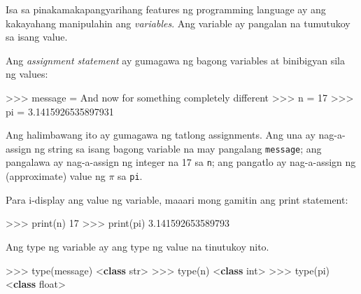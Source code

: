 \documentclass[10pt,]{book}
\newenvironment{Shaded}{}{}
\newcommand{\BuiltInTok}[1]{\textcolor[rgb]{0.00,0.50,0.00}{#1}}
\newcommand{\DecValTok}[1]{\textcolor[rgb]{0.25,0.63,0.44}{#1}}
\newcommand{\FloatTok}[1]{\textcolor[rgb]{0.25,0.63,0.44}{#1}}
\newcommand{\KeywordTok}[1]{\textcolor[rgb]{0.00,0.44,0.13}{\textbf{#1}}}
\newcommand{\NormalTok}[1]{#1}
\newcommand{\OperatorTok}[1]{\textcolor[rgb]{0.40,0.40,0.40}{#1}}
\newcommand{\StringTok}[1]{\textcolor[rgb]{0.25,0.44,0.63}{#1}}
\begin{document}
 

Isa sa pinakamakapangyarihang features ng programming language ay ang
kakayahang manipulahin ang \emph{variables}. Ang variable ay pangalan na
tumutukoy sa isang value.

Ang \emph{assignment statement} ay gumagawa ng bagong variables at
binibigyan sila ng values:

\begin{Shaded}
\begin{Highlighting}[]
\OperatorTok{\textgreater{}\textgreater{}\textgreater{}}\NormalTok{ message }\OperatorTok{=} \StringTok{\textquotesingle{}And now for something completely different\textquotesingle{}}
\OperatorTok{\textgreater{}\textgreater{}\textgreater{}}\NormalTok{ n }\OperatorTok{=} \DecValTok{17}
\OperatorTok{\textgreater{}\textgreater{}\textgreater{}}\NormalTok{ pi }\OperatorTok{=} \FloatTok{3.1415926535897931}
\end{Highlighting}
\end{Shaded}

Ang halimbawang ito ay gumagawa ng tatlong assignments. Ang una ay
nag-a-assign ng string sa isang bagong variable na may pangalang
\texttt{message}; ang pangalawa ay nag-a-assign ng integer na 17 sa
\texttt{n}; ang pangatlo ay nag-a-assign ng (approximate) value ng
\(\pi\) sa \texttt{pi}.

Para i-display ang value ng variable, maaari mong gamitin ang print
statement:

\begin{Shaded}
\begin{Highlighting}[]
\OperatorTok{\textgreater{}\textgreater{}\textgreater{}} \BuiltInTok{print}\NormalTok{(n)}
\DecValTok{17}
\OperatorTok{\textgreater{}\textgreater{}\textgreater{}} \BuiltInTok{print}\NormalTok{(pi)}
\FloatTok{3.141592653589793}
\end{Highlighting}
\end{Shaded}

Ang type ng variable ay ang type ng value na tinutukoy nito.

\begin{Shaded}
\begin{Highlighting}[]
\OperatorTok{\textgreater{}\textgreater{}\textgreater{}} \BuiltInTok{type}\NormalTok{(message)}
\OperatorTok{\textless{}}\KeywordTok{class} \StringTok{\textquotesingle{}str\textquotesingle{}}\OperatorTok{\textgreater{}}
\OperatorTok{\textgreater{}\textgreater{}\textgreater{}} \BuiltInTok{type}\NormalTok{(n)}
\OperatorTok{\textless{}}\KeywordTok{class} \StringTok{\textquotesingle{}int\textquotesingle{}}\OperatorTok{\textgreater{}}
\OperatorTok{\textgreater{}\textgreater{}\textgreater{}} \BuiltInTok{type}\NormalTok{(pi)}
\OperatorTok{\textless{}}\KeywordTok{class} \StringTok{\textquotesingle{}float\textquotesingle{}}\OperatorTok{\textgreater{}}
\end{Highlighting}
\end{Shaded}
\end{document}
